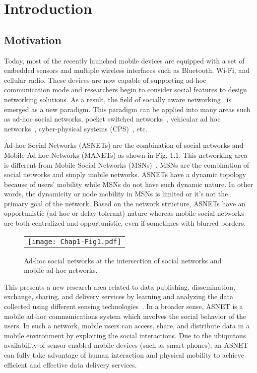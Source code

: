 \chapter{Introduction}\label{Chap1}

\section{Motivation}\label{Chap1_01}

Today, most of the recently launched mobile devices are equipped with a set of embedded sensors and multiple wireless interfaces such as Bluetooth, Wi-Fi, and cellular radio. These devices are now capable of supporting ad-hoc communication mode and researchers begin to consider social features to design networking solutions. As a result, the field of socially aware networking~\cite{FXia2013} is emerged as a new paradigm. This paradigm can be applied into many areas such as ad-hoc social networks, pocket switched networks~\cite{SWang2012}, vehicular ad hoc networks~\cite{WChen2008}, cyber-physical systems (CPS)~\cite{FJWu2011}, etc.

Ad-hoc Social Networks (ASNETs) are the combination of social networks and Mobile Ad-hoc Networks (MANETs) as shown in Fig. 1.1. This networking area is different from Mobile Social Networks (MSNs)~\cite{NKayastha2012}. MSNs are the combination of social networks and simply mobile networks. ASNETs have a dynamic topology because of users' mobility while MSNs do not have such dynamic nature. In other words, the dynamicity or node mobility in MSNs is limited or it's not the primary goal of the network. Based on the network structure, ASNETs have an opportunistic (ad-hoc or delay tolerant) nature whereas mobile social networks are both centralized and opportunistic, even if sometimes with blurred borders.
\begin{figure}[b]
\begin{center}
  \begin{tabular}{c}
  \texttt{[image: Chap1-Fig1.pdf]}
  \end{tabular}
  \caption{Ad-hoc social networks at the intersection of social networks and mobile ad-hoc networks.}
\end{center}
\end{figure}

This presents a new research area related to data publishing, dissemination, exchange, sharing, and delivery services by learning and analyzing the data collected using different sensing technologies~\cite{RKGanti2011}. In a broader sense, ASNET is a mobile ad-hoc communications system which involves the social behavior of the users. In such a network, mobile users can access, share, and distribute data in a mobile environment by exploiting the social interactions. Due to the ubiquitous availability of sensor enabled mobile devices (such as smart phones); an ASNET can fully take advantage of human interaction and physical mobility to achieve efficient and effective data delivery services.

